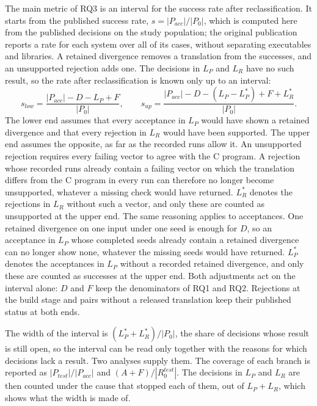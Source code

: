 The main metric of RQ3 is an interval for the success rate after reclassification. It starts from the published success rate, $s = |P_{\mathit{acc}}| / |P_0|$, which is computed here from the published decisions on the study population; the original publication reports a rate for each system over all of its cases, without separating executables and libraries. A retained divergence removes a translation from the successes, and an unsupported rejection adds one. The decisions in $L_P$ and $L_R$ have no such result, so the rate after reclassification is known only up to an interval:
\begin{equation}
s_{\mathit{low}} = \frac{|P_{\mathit{acc}}| - D - L_P + F}{|P_0|}, \qquad
s_{\mathit{up}} = \frac{|P_{\mathit{acc}}| - D - (L_P - L_P^{\ast}) + F + L_R^{\ast}}{|P_0|}.
\end{equation}
The lower end assumes that every acceptance in $L_P$ would have shown a retained divergence and that every rejection in $L_R$ would have been supported. The upper end assumes the opposite, as far as the recorded runs allow it. An unsupported rejection requires every failing vector to agree with the C program. A rejection whose recorded runs already contain a failing vector on which the translation differs from the C program in every run can therefore no longer become unsupported, whatever a missing check would have returned. $L_R^{\ast}$ denotes the rejections in $L_R$ without such a vector, and only these are counted as unsupported at the upper end. The same reasoning applies to acceptances. One retained divergence on one input under one seed is enough for $D$, so an acceptance in $L_P$ whose completed seeds already contain a retained divergence can no longer show none, whatever the missing seeds would have returned. $L_P^{\ast}$ denotes the acceptances in $L_P$ without a recorded retained divergence, and only these are counted as successes at the upper end. Both adjustments act on the interval alone: $D$ and $F$ keep the denominators of RQ1 and RQ2. Rejections at the build stage and pairs without a released translation keep their published status at both ends.

The width of the interval is $(L_P^{\ast} + L_R^{\ast})/|P_0|$, the share of decisions whose result is still open, so the interval can be read only together with the reasons for which decisions lack a result. Two analyses supply them. The coverage of each branch is reported as $|P_{\mathit{test}}|/|P_{\mathit{acc}}|$ and $(A+F)/|R_0^{\mathit{test}}|$. The decisions in $L_P$ and $L_R$ are then counted under the cause that stopped each of them, out of $L_P + L_R$, which shows what the width is made of.

